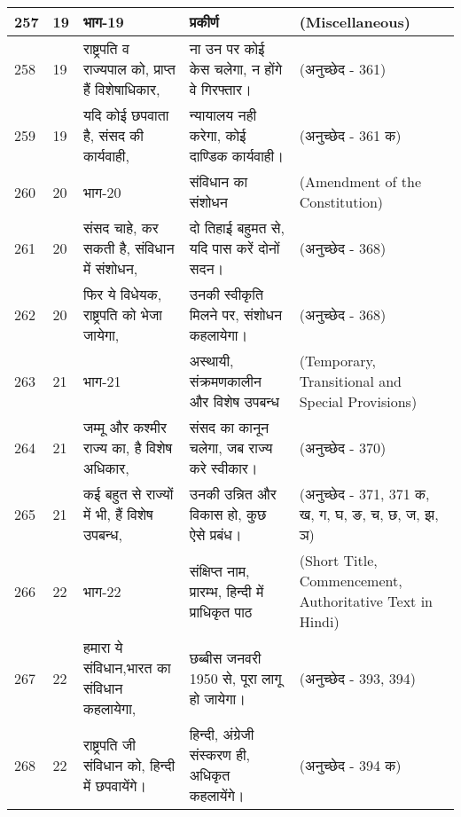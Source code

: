 \begin{longtable}{|l|l|l|l|l|}
257 & 19 & भाग-19 & प्रकीर्ण  & (Miscellaneous) \\ \hline 
258 & 19 & राष्ट्रपति व राज्यपाल को, प्राप्त हैं विशेषाधिकार, & ना उन पर कोई केस चलेगा, न होंगे वे गिरफ्तार। & (अनुच्छेद - 361) \\ \hline 
259 & 19 & यदि कोई छपवाता है, संसद की कार्यवाही, & न्यायालय नही करेगा, कोई दाण्डिक कार्यवाही। & (अनुच्छेद - 361 क) \\ \hline 
260 & 20 & भाग-20 & संविधान का संशोधन  & (Amendment of the Constitution) \\ \hline 
261 & 20 & संसद चाहे, कर सकती है, संविधान में संशोधन, & दो तिहाई बहुमत से, यदि पास करें दोनों सदन। & (अनुच्छेद - 368) \\ \hline 
262 & 20 & फिर ये विधेयक, राष्ट्रपति को भेजा जायेगा, & उनकी स्वीकृति मिलने पर, संशोधन कहलायेगा। & (अनुच्छेद - 368) \\ \hline 
263 & 21 & भाग-21 & अस्थायी, संक्रमणकालीन और विशेष उपबन्ध & (Temporary, Transitional and Special Provisions) \\ \hline 
264 & 21 & जम्मू और कश्मीर राज्य का, है विशेष अधिकार, & संसद का कानून चलेगा, जब राज्य करे स्वीकार। & (अनुच्छेद - 370) \\ \hline 
265 & 21 & कई बहुत से राज्यों में भी, हैं विशेष उपबन्ध, & उनकी उन्नित और विकास हो, कुछ ऐसे प्रबंध। & (अनुच्छेद - 371, 371 क, ख, ग, घ, ङ, च, छ, ज, झ, ञ) \\ \hline 
266 & 22 & भाग-22 & संक्षिप्त नाम, प्रारम्भ, हिन्दी में प्राधिकृत पाठ & (Short Title, Commencement, Authoritative Text in Hindi) \\ \hline 
267 & 22 & हमारा ये संविधान,भारत का संविधान कहलायेगा, & छब्बीस जनवरी 1950 से, पूरा लागू हो जायेगा। & (अनुच्छेद - 393, 394) \\ \hline 
268 & 22 & राष्ट्रपति जी संविधान को, हिन्दी में छपवायेंगे। & हिन्दी, अंग्रेजी संस्करण ही, अधिकृत कहलायेंगे। & (अनुच्छेद - 394 क) \\ \hline 
 \end{longtable}
